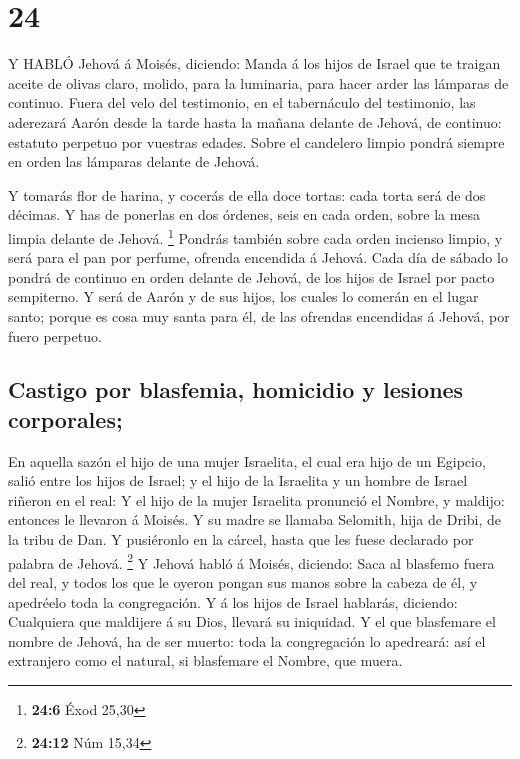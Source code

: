 \hypertarget{section-23}{%
\section{24}\label{section-23}}

 Y HABLÓ Jehová á Moisés, diciendo:  Manda á los
hijos de Israel que te traigan aceite de olivas claro, molido, para la
luminaria, para hacer arder las lámparas de continuo.  Fuera
del velo del testimonio, en el tabernáculo del testimonio, las aderezará
Aarón desde la tarde hasta la mañana delante de Jehová, de continuo:
estatuto perpetuo por vuestras edades.  Sobre el candelero
limpio pondrá siempre en orden las lámparas delante de Jehová.

 Y tomarás flor de harina, y cocerás de ella doce tortas:
cada torta será de dos décimas.  Y has de ponerlas en dos
órdenes, seis en cada orden, sobre la mesa limpia delante de Jehová.
\footnote{\textbf{24:6} Éxod 25,30}  Pondrás también sobre
cada orden incienso limpio, y será para el pan por perfume, ofrenda
encendida á Jehová.  Cada día de sábado lo pondrá de
continuo en orden delante de Jehová, de los hijos de Israel por pacto
sempiterno.  Y será de Aarón y de sus hijos, los cuales lo
comerán en el lugar santo; porque es cosa muy santa para él, de las
ofrendas encendidas á Jehová, por fuero perpetuo.

\hypertarget{castigo-por-blasfemia-homicidio-y-lesiones-corporales}{%
\subsection{Castigo por blasfemia, homicidio y lesiones
corporales;}\label{castigo-por-blasfemia-homicidio-y-lesiones-corporales}}

 En aquella sazón el hijo de una mujer Israelita, el cual
era hijo de un Egipcio, salió entre los hijos de Israel; y el hijo de la
Israelita y un hombre de Israel riñeron en el real:  Y el
hijo de la mujer Israelita pronunció el Nombre, y maldijo: entonces le
llevaron á Moisés. Y su madre se llamaba Selomith, hija de Dribi, de la
tribu de Dan.  Y pusiéronlo en la cárcel, hasta que les
fuese declarado por palabra de Jehová. \footnote{\textbf{24:12} Núm
  15,34}  Y Jehová habló á Moisés, diciendo: 
Saca al blasfemo fuera del real, y todos los que le oyeron pongan sus
manos sobre la cabeza de él, y apedréelo toda la congregación.
 Y á los hijos de Israel hablarás, diciendo: Cualquiera que
maldijere á su Dios, llevará su iniquidad.  Y el que
blasfemare el nombre de Jehová, ha de ser muerto: toda la congregación
lo apedreará: así el extranjero como el natural, si blasfemare el
Nombre, que muera.

